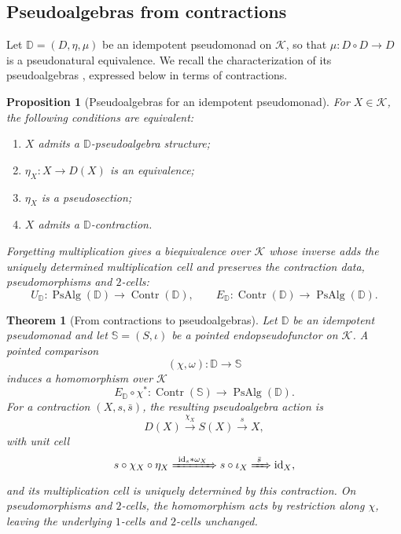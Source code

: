 \documentclass[11pt,a4paper]{article}
\numberwithin{equation}{section}
\newtheorem{theorem}{Theorem}[section]
\newtheorem{proposition}[proposition]{Proposition}
\theoremstyle{definition}
\theoremstyle{remark}
\newcommand{\id}{\mathrm{id}}
\newcommand{\Kcat}{\mathcal K}
\newcommand{\Dmon}{\mathbb D}
\newcommand{\Contr}{\operatorname{Contr}}
\newcommand{\PsAlg}{\operatorname{PsAlg}}
\begin{document}
\subsection{Pseudoalgebras from contractions}

Let $\Dmon=(D,\eta,\mu)$ be an idempotent pseudomonad on $\Kcat$, so
that $\mu\colon D\circ D\to D$ is a pseudonatural equivalence.
We recall the characterization of its pseudoalgebras
\cite[Theorems~2.18 and~2.20]{Nunes2018}, expressed below in terms
of contractions.

\begin{proposition}[Pseudoalgebras for an idempotent pseudomonad]
\label{prop:idempotent-upgrade}
For $X\in\Kcat$, the following conditions are equivalent:
\begin{enumerate}[label=\textup{(\roman*)},leftmargin=2.7em]
  \item $X$ admits a $\Dmon$-pseudoalgebra structure;
  \item $\eta_X\colon X\to D(X)$ is an equivalence;
  \item $\eta_X$ is a pseudosection;
  \item $X$ admits a $\Dmon$-contraction.
\end{enumerate}
Forgetting multiplication gives a biequivalence over $\Kcat$ whose
inverse adds the uniquely determined multiplication cell and
preserves the contraction data, pseudomorphisms and $2$-cells:
\begin{equation}
  U_{\Dmon}\colon\PsAlg(\Dmon)\longrightarrow\Contr(\Dmon),
  \qquad
  E_{\Dmon}\colon\Contr(\Dmon)\longrightarrow\PsAlg(\Dmon).
  \label{eq:idempotent-forgetful-equivalence}
\end{equation}
\end{proposition}



\begin{theorem}[From contractions to pseudoalgebras]
\label{thm:contraction-transfer}
Let $\Dmon$ be an idempotent pseudomonad and let
$\mathbb S=(S,\iota)$ be a pointed endopseudofunctor on $\Kcat$.
A pointed comparison
\[
  (\chi,\omega)\colon\Dmon\longrightarrow\mathbb S
\]
induces a homomorphism over $\Kcat$
\[
  E_{\Dmon}\circ\chi^*\colon
  \Contr(\mathbb S)\longrightarrow\PsAlg(\Dmon).
\]
For a contraction $(X,s,\bar s)$, the resulting pseudoalgebra action is
\begin{equation}
  D(X)\xrightarrow{\chi_X}S(X)\xrightarrow{s}X,
  \label{eq:transferred-action}
\end{equation}
with unit cell
\[
  s\circ\chi_X\circ\eta_X
  \xRightarrow{\ \id_s\ast\omega_X\ }s\circ\iota_X
  \xRightarrow{\ \bar s\ }\id_X,
\]
and its multiplication cell is uniquely determined by this
contraction. On pseudomorphisms and $2$-cells, the homomorphism
acts by restriction along $\chi$, leaving the underlying $1$-cells
and $2$-cells unchanged.
\end{theorem}
\end{document}

